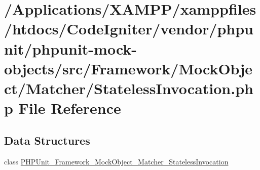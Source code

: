 \hypertarget{_stateless_invocation_8php}{}\section{/\+Applications/\+X\+A\+M\+P\+P/xamppfiles/htdocs/\+Code\+Igniter/vendor/phpunit/phpunit-\/mock-\/objects/src/\+Framework/\+Mock\+Object/\+Matcher/\+Stateless\+Invocation.php File Reference}
\label{_stateless_invocation_8php}
\subsection*{Data Structures}
\begin{DoxyCompactItemize}
\item 
class \mbox{\hyperlink{class_p_h_p_unit___framework___mock_object___matcher___stateless_invocation}{P\+H\+P\+Unit\+\_\+\+Framework\+\_\+\+Mock\+Object\+\_\+\+Matcher\+\_\+\+Stateless\+Invocation}}
\end{DoxyCompactItemize}
